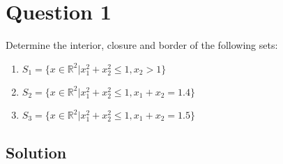 \section*{Question 1}

Determine the interior, closure and border of the following sets:

\begin{enumerate}[label=(\alph*)]
\item $S_1 = \{x \in \mathbb{R}^2 | x_1^2 + x_2^2 \leqslant 1, x_2 > 1 \}$

\item $S_2 = \{x \in \mathbb{R}^2 | x_1^2 + x_2^2 \leqslant 1, x_1 + x_2 = 1.4 \}$

\item $S_3 = \{x \in \mathbb{R}^2 | x_1^2 + x_2^2 \leqslant 1, x_1 + x_2 = 1.5 \} $
\end{enumerate}

\subsection*{Solution}

